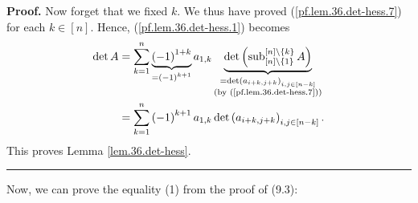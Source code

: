 \documentclass[numbers=enddot,12pt,final,onecolumn,notitlepage]{scrartcl}%
\theoremstyle{definition}
\newenvironment{proof}[1][Proof]{\noindent\textbf{#1.} }{\ \rule{0.5em}{0.5em}}
\let\sumnonlimits\sum
\renewcommand{\sum}{\sumnonlimits\limits}
\begin{document}
\begin{enumerate}
\begin{proof}
Now forget that we fixed $k$. We thus have proved (\ref{pf.lem.36.det-hess.7})
for each $k\in\left[  n\right]  $. Hence, (\ref{pf.lem.36.det-hess.1}) becomes%
\begin{align*}
\det A  &  =\sum_{k=1}^{n}\underbrace{\left(  -1\right)  ^{1+k}}_{=\left(
-1\right)  ^{k+1}}a_{1,k}\underbrace{\det\left(  \operatorname*{sub}%
\nolimits_{\left[  n\right]  \setminus\left\{  1\right\}  }^{\left[  n\right]
\setminus\left\{  k\right\}  }A\right)  }_{\substack{=\det\left(
a_{i+k,j+k}\right)  _{i,j\in\left[  n-k\right]  }\\\text{(by
(\ref{pf.lem.36.det-hess.7}))}}}\\
&  =\sum_{k=1}^{n}\left(  -1\right)  ^{k+1}a_{1,k}\det\left(  a_{i+k,j+k}%
\right)  _{i,j\in\left[  n-k\right]  }.
\end{align*}
This proves Lemma \ref{lem.36.det-hess}.
\end{proof}

Now, we can prove the equality (1) from the proof of (9.3):


\end{enumerate}
\end{document}
